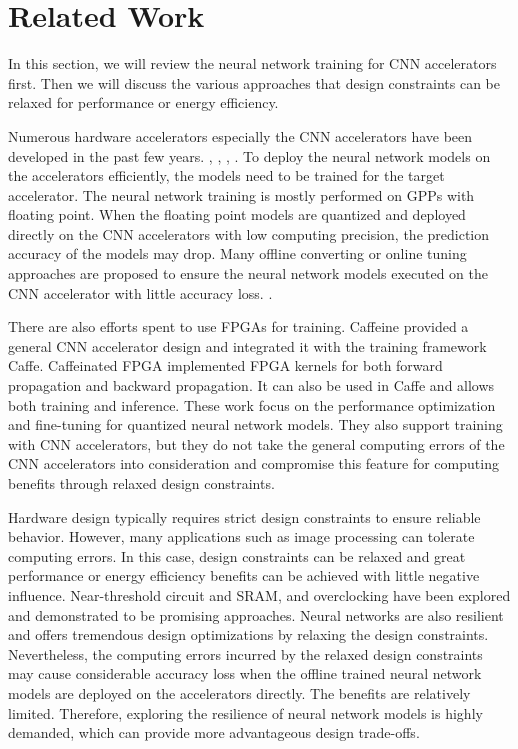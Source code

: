 \section{Related Work} \label{sec:relatedwork}
In this section, we will review the neural network training for CNN accelerators first.
Then we will discuss the various approaches that design constraints can be relaxed for
performance or energy efficiency. 

Numerous hardware accelerators especially the CNN accelerators have
been developed in the past few years. \cite{Cnvlutin_25} 
\cite{deepburing_12}, \cite{Aydonat_27}, 
\cite{Caffeine_6}, \cite{Wei_29}. To 
deploy the neural network models on the accelerators efficiently, 
the models need to be trained for the target accelerator. 
The neural network training is mostly performed on GPPs with floating point.
When the floating point models are quantized and deployed directly 
on the CNN accelerators with low computing precision, the prediction 
accuracy of the models may drop. Many offline converting or online 
tuning approaches are proposed to ensure the neural network models 
executed on the CNN accelerator with little accuracy loss.
\cite{Matthieu2014_8, Hwang2014_17}. 

There are also efforts spent to use FPGAs for training. 
Caffeine\cite{Caffeine_6} provided a general CNN accelerator design and integrated it with 
the training framework Caffe. Caffeinated FPGA\cite{DiCecco_4} implemented FPGA kernels 
for both forward propagation and backward propagation. It can also be used in Caffe 
and allows both training and inference. These work focus on the performance optimization 
and fine-tuning for quantized neural network models. 
They also support training with CNN accelerators, but they do not take the general 
computing errors of the CNN accelerators into consideration and compromise this 
feature for computing benefits through relaxed design constraints.

Hardware design typically requires strict design constraints to ensure 
reliable behavior. However, many applications such as image processing 
can tolerate computing errors. In this case, design constraints can be 
relaxed and great performance or energy efficiency benefits can be achieved 
with little negative influence. Near-threshold circuit and SRAM, 
and overclocking \cite{overclock_3} have been explored and demonstrated 
to be promising approaches. Neural networks are also resilient and 
offers tremendous design optimizations by relaxing the design constraints. 
Nevertheless, the computing errors incurred by the relaxed design constraints 
may cause considerable accuracy loss when the offline 
trained neural network models are deployed on the accelerators directly. 
The benefits are relatively limited. Therefore, exploring the resilience 
of neural network models is highly demanded, which can provide more 
advantageous design trade-offs. 
